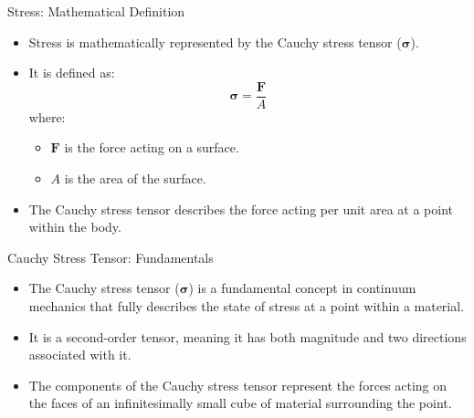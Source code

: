 \documentclass{beamer}
\begin{document}
\begin{frame}{Stress: Mathematical Definition}
    \begin{itemize}
        \item Stress is mathematically represented by the Cauchy stress tensor ($\boldsymbol{\sigma}$).
        \item It is defined as:
        \begin{equation*}
            \boldsymbol{\sigma} = \frac{\mathbf{F}}{A}
        \end{equation*}
        where:
        \begin{itemize}
            \item $\mathbf{F}$ is the force acting on a surface.
            \item $A$ is the area of the surface.
        \end{itemize}
        \item The Cauchy stress tensor describes the force acting per unit area at a point within the body.
    \end{itemize}
\end{frame}

\begin{frame}{Cauchy Stress Tensor: Fundamentals}
    \begin{itemize}
        \item The Cauchy stress tensor ($\boldsymbol{\sigma}$) is a fundamental concept in continuum mechanics that fully describes the state of stress at a point within a material.
        \item It is a second-order tensor, meaning it has both magnitude and two directions associated with it.
        \item The components of the Cauchy stress tensor represent the forces acting on the faces of an infinitesimally small cube of material surrounding the point.
    \end{itemize}
\end{frame}
\end{document}
